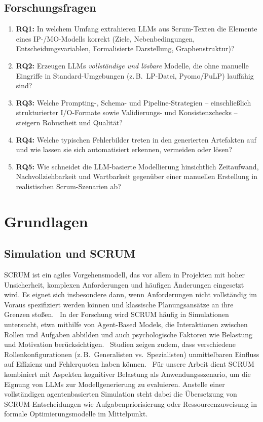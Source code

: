\documentclass[runningheads]{llncs}
\begin{document}
\subsection{Forschungsfragen}
\begin{enumerate} 
  \item \textbf{RQ1:} In welchem Umfang extrahieren LLMs aus Scrum-Texten die Elemente eines IP-/MO-Modells korrekt (Ziele, Nebenbedingungen, Entscheidungsvariablen, Formalisierte Darstellung, Graphenstruktur)? 
  \item \textbf{RQ2:} Erzeugen LLMs \emph{vollständige und lösbare} Modelle, die ohne manuelle Eingriffe in Standard-Umgebungen (z.\,B.\ LP-Datei, Pyomo/PuLP) lauffähig sind?
  \item \textbf{RQ3:} Welche Prompting-, Schema- und Pipeline-Strategien -- einschließlich strukturierter I/O-Formate sowie Validierungs- und Konsistenzchecks -- steigern Robustheit und Qualität?
  \item \textbf{RQ4:} Welche typischen Fehlerbilder treten in den generierten Artefakten auf und wie lassen sie sich automatisiert erkennen, vermeiden oder lösen?
  \item \textbf{RQ5:} Wie schneidet die LLM-basierte Modellierung hinsichtlich Zeitaufwand, Nachvollziehbarkeit und Wartbarkeit gegenüber einer manuellen Erstellung in realistischen Scrum-Szenarien ab?
\end{enumerate}

\section{Grundlagen}

\subsection{Simulation und SCRUM}
SCRUM ist ein agiles Vorgehensmodell, das vor allem in Projekten mit hoher Unsicherheit, komplexen Anforderungen und häufigen Änderungen eingesetzt wird. Es eignet sich insbesondere dann, wenn Anforderungen nicht vollständig im Voraus spezifiziert werden können und klassische Planungsansätze an ihre Grenzen stoßen.~\cite{ref_book1} In der Forschung wird SCRUM häufig in Simulationen untersucht, etwa mithilfe von Agent-Based Models, die Interaktionen zwischen Rollen und Aufgaben abbilden und auch psychologische Faktoren wie Belastung und Motivation berücksichtigen.~\cite{ref_article8} Studien zeigen zudem, dass verschiedene Rollenkonfigurationen (z.\,B.\ Generalisten vs.\ Spezialisten) unmittelbaren Einfluss auf Effizienz und Fehlerquoten haben können.~\cite{ref_article7} Für unsere Arbeit dient SCRUM kombiniert mit Aspekten kognitiver Belastung als Anwendungsszenario, um die Eignung von LLMs zur Modellgenerierung zu evaluieren. Anstelle einer vollständigen agentenbasierten Simulation steht dabei die Übersetzung von SCRUM-Entscheidungen wie Aufgabenpriorisierung oder Ressourcenzuweisung in formale Optimierungsmodelle im Mittelpunkt.
\end{document}
